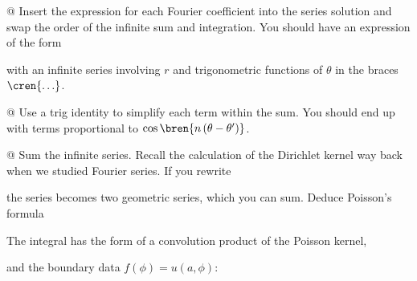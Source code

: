 \documentclass[10pt]{article}
\begin{document}
\begin{easylist}[enumerate]
    @ Insert the expression for each Fourier coefficient into the series solution and swap the order of the infinite sum
    and integration. You should have an expression of the form


    with an infinite series involving $r$ and trigonometric functions of $\theta$ in the braces $\cren{\ldots}$.

    @ Use a trig identity to simplify each term within the sum. You should end up with terms proportional to
    $\cos\bren{n\pren{\theta-\theta^\prime}}$.

    @ Sum the infinite series. Recall the calculation of the Dirichlet kernel way back when we studied Fourier series.
    If you rewrite


    the series becomes two geometric series, which you can sum. Deduce Poisson's formula

    \label{eq:poissonform}

    The integral has the form of a convolution product of the Poisson kernel,


    and the boundary data $f(\phi) = u(a, \phi)$:

\end{easylist}
\end{document}
